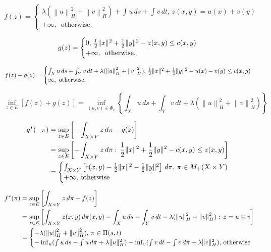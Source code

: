 $$f(z) = \begin{cases}
\lambda( \left\|u\right\|_H^2 + \left\|v\right\|_H^2) + \int u\,ds + \int v\,dt, \, z(x,y)=u(x)+v(y) \\
+\infty, \, \textrm{ otherwise.}
\end{cases}$$

$$g(z) = \begin{cases}
0, \, \frac{1}{2}\lVert x\rVert^2 + \frac{1}{2}\lVert y\rVert^2 - z(x,y)\leq c(x,y) \\
+\infty, \, \textrm{ otherwise.}
\end{cases}$$

$$f(z)+g(z) = \begin{cases}
\int_X u\,ds + \int_Y v\,dt + \lambda(\left\|u\right\|_H^2 + \left\|v\right\|_H^2), \, \frac{1}{2}\lVert x\rVert^2 + \frac{1}{2}\lVert y\rVert^2 - u(x) - v(y)\leq c(x,y) \\
\infty, \textrm{ otherwise.}
\end{cases}$$

$$\inf_{z\in E} [f(z)+g(z)] = \inf_{(u,v)\in \Phi_c} \left\{ \int_X u\,ds + \int_Y v\,dt + \lambda(\left\|u\right\|_H^2 + \left\|v\right\|_H^2) \right\}$$

\begin{align*}
g^{*}(-\pi) &= \sup_{z\in E} \left[ -\int_{X\times Y} z\,d\pi - g(z)\right] \\
&= \sup_{z\in E} \left[ - \int_{X\times Y} z\,d\pi :\, \frac{1}{2}\lVert x\rVert^2 + \frac{1}{2}\lVert y\rVert^2 - c(x,y)\leq z(x,y) \right] \\
&= \begin{cases}
\int_{X\times Y} \left[c(x,y) - \frac{1}{2}\lVert x\rVert^2 - \frac{1}{2}\lVert y\rVert^2\right] \,d\pi,\, \pi\in M_{+}(X\times Y) \\
+\infty, \, \textrm{otherwise}
\end{cases}
\end{align*}

\begin{align*}
f^{*}(\pi) &= \sup_{z\in E} \left[ \int_{X\times Y} z\,d\pi - f(z)\right] \\
&= \sup_{z\in E} \left[ \int_{X\times Y} z(x,y)\,d\pi(x,y) - \int_X u\,ds - \int_Y v\,dt - \lambda(\left\|u\right\|_H^2 + \left\|v\right\|_H^2) :\, z= u\oplus v \right] \\
&= \begin{cases}
- \lambda(\left\|u\right\|_H^2 + \left\|v\right\|_H^2), \, \pi\in \Pi(s,t) \\
-\inf_u (\int u\,ds - \int u\,d\pi + \lambda \lVert u\rVert_H^2) - \inf_v (\int v\,dt - \int v\,d\pi + \lambda \lVert v\rVert_H^2), \, \textrm{otherwise}
\end{cases}
\end{align*}

